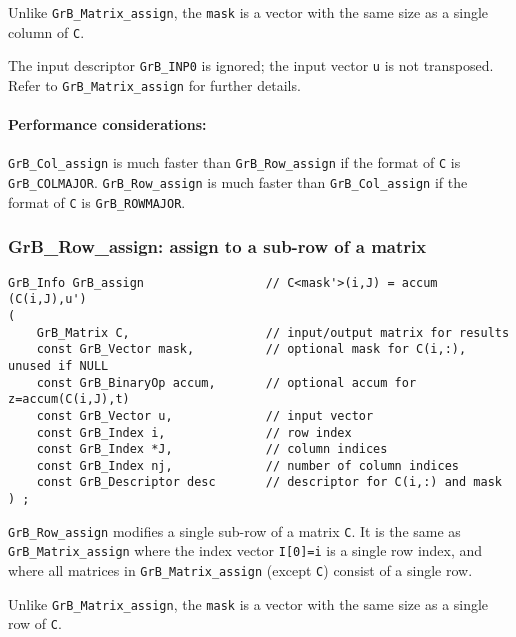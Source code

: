 \documentclass[12pt]{article}
\begin{document}
Unlike \verb'GrB_Matrix_assign', the \verb'mask' is a vector with the same size
as a single column of \verb'C'.

The input descriptor \verb'GrB_INP0' is ignored; the input vector \verb'u' is
not transposed.  Refer to \verb'GrB_Matrix_assign' for further details.

\paragraph{\bf Performance considerations:} %
\verb'GrB_Col_assign' is much faster than \verb'GrB_Row_assign' if the format
of \verb'C' is \verb'GrB_COLMAJOR'.  \verb'GrB_Row_assign' is much faster than
\verb'GrB_Col_assign' if the format of \verb'C' is \verb'GrB_ROWMAJOR'.

\newpage
\subsubsection{{\sf GrB\_Row\_assign:} assign to a sub-row of a matrix}
\label{assign_row}

\begin{mdframed}[userdefinedwidth=6in]
{\footnotesize
\begin{verbatim}
GrB_Info GrB_assign                 // C<mask'>(i,J) = accum (C(i,J),u')
(
    GrB_Matrix C,                   // input/output matrix for results
    const GrB_Vector mask,          // optional mask for C(i,:), unused if NULL
    const GrB_BinaryOp accum,       // optional accum for z=accum(C(i,J),t)
    const GrB_Vector u,             // input vector
    const GrB_Index i,              // row index
    const GrB_Index *J,             // column indices
    const GrB_Index nj,             // number of column indices
    const GrB_Descriptor desc       // descriptor for C(i,:) and mask
) ;
\end{verbatim} } \end{mdframed}

\verb'GrB_Row_assign' modifies a single sub-row of a matrix \verb'C'.  It is
the same as \verb'GrB_Matrix_assign' where the index vector \verb'I[0]=i' is
a single row index, and where all matrices in \verb'GrB_Matrix_assign'
(except \verb'C') consist of a single row.

Unlike \verb'GrB_Matrix_assign', the \verb'mask' is a vector with the same size
as a single row of \verb'C'.
\end{document}
